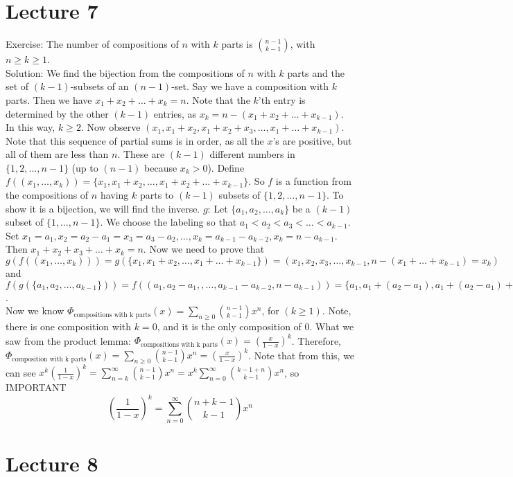 \documentclass[10pt,letter]{article}
\begin{document}
\section*{Lecture 7}
Exercise: The number of compositions of $n$ with $k$ parts is ${n-1\choose k-1}$, with $n\geq k\geq 1$. \\ 
Solution: We find the bijection from the compositions of $n$ with $k$ parts and the set of $(k-1)$-subsets of an $(n-1)$-set. Say we have a composition with $k$ parts. Then we have $x_1+x_2+\ldots+x_k=n$. Note that the $k$'th entry is determined by the other $(k-1)$ entries, as $x_k=n-(x_1+x_2+\ldots+x_{k-1})$. In this way, $k\geq2$. Now observe $(x_1,x_1+x_2,x_1+x_2+x_3,\ldots,x_1+\ldots+x_{k-1})$. Note that this sequence of partial sums is in order, as all the $x$'s are positive, but all of them are less than $n$. These are $(k-1)$ different numbers in $\{1,2,\ldots,n-1\}$ (up to $(n-1)$ because $x_k>0$).
Define $f((x_1,\ldots,x_k))=\{x_1,x_1+x_2,\ldots,x_1+x_2+\ldots+x_{k-1}\}$. So $f$ is a function from the compositions of $n$ having $k$ parts to $(k-1)$ subsets of $\{1,2,\ldots,n-1\}$. To show it is a bijection, we will find the inverse. 
$g$: Let $\{a_1,a_2,\ldots,a_k\}$ be a $(k-1)$ subset of $\{1,\ldots,n-1\}$. We choose the labeling so that $a_1<a_2<a_3<\ldots<a_{k-1}$. Set $x_1=a_1,x_2=a_2-a_1=x_3=a_3-a_2,\ldots,x_k=a_{k-1}-a_{k-2},x_k=n-a_{k-1}$. Then $x_1+x_2+x_3+\ldots+x_k=n$. 
Now we need to prove that $g(f((x_1,\ldots,x_k)))=g(\{x_1,x_1+x_2,\ldots,x_1+\ldots+x_{k-1}\})=(x_1,x_2,x_3,\ldots,x_{k-1},n-(x_1+\ldots+x_{k-1})=x_k)$ and $f(g(\{a_1,a_2,\ldots,a_{k-1}\}))=f((a_1,a_2-a_1,,\ldots,a_{k-1}-a_{k-2},n-a_{k-1}))=\{a_1,a_1+(a_2-a_1),a_1+(a_2-a_1)+(a_3-a_2)\}=\{a_1,a_2,a_3,\ldots,a_{k-1}\}$. \\ 
Now we know $\Phi_{\text{compositions with k parts}}(x)=\sum_{n\geq0}{n-1\choose k-1}x^n$, for $(k\geq1)$. Note, there is one composition with $k=0$, and it is the only composition of $0$. What we saw from the product lemma: $\Phi_{\text{compositions with k parts}}(x)=\left(\frac{x}{1-x}\right)^k$. Therefore, $\Phi_{\text{composition with k parts}}(x)=\sum_{n\geq 0}{n-1\choose k-1}x^n=\left(\frac{x}{1-x}\right)^k$. Note that from this, we can see $x^k\left(\frac{1}{1-x}\right)^k=\sum_{n=k}^\infty{n-1\choose k-1}x^n=x^k\sum_{n=0}^\infty{k-1+n\choose k-1}x^n$, so IMPORTANT$$\left(\frac{1}{1-x}\right)^k=\sum_{n=0}^\infty{n+k-1\choose k-1}x^n$$

\section*{Lecture 8}
\end{document}

